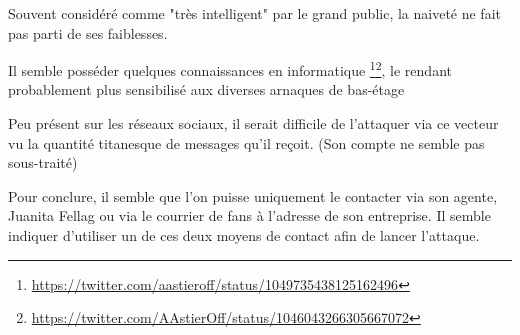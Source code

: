 Souvent considéré comme "très intelligent" par le grand public, la naiveté ne fait pas parti de ses faiblesses.

Il semble posséder quelques connaissances en informatique \footnote{\url{https://twitter.com/aastieroff/status/1049735438125162496}}\footnote{\url{https://twitter.com/AAstierOff/status/1046043266305667072}}, le rendant probablement plus sensibilisé aux diverses arnaques de bas-étage

Peu présent sur les réseaux sociaux, il serait difficile de l'attaquer via ce vecteur vu la quantité titanesque de messages qu'il reçoit. (Son compte ne semble pas sous-traité)

Pour conclure, il semble que l'on puisse uniquement le contacter via son agente, Juanita Fellag ou via le courrier de fans à l'adresse de son entreprise. Il semble indiquer d'utiliser un de ces deux moyens de contact afin de lancer l'attaque.
